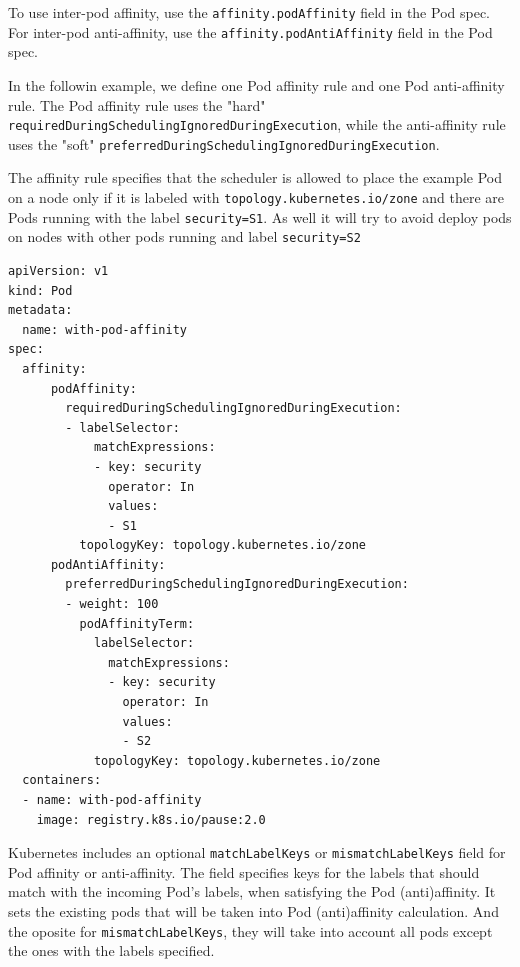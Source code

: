\documentclass{article}
\newenvironment{codetemplate}[1][]{%
  \mybasecolorbox[#1]
  \itshape
}{%
  \endmybasecolorbox
}
\begin{document}
To use inter-pod affinity, use the \verb|affinity.podAffinity| field in the Pod spec. For inter-pod anti-affinity, use the \verb|affinity.podAntiAffinity| field in the Pod spec.

In the followin example, we define one Pod affinity rule and one Pod anti-affinity rule. The Pod affinity rule uses the "hard" 
\verb|requiredDuringSchedulingIgnoredDuringExecution|, while the anti-affinity rule uses the "soft" 
\verb|preferredDuringSchedulingIgnoredDuringExecution|. 

The affinity rule specifies that the scheduler is allowed to place the example Pod on a node only if it is labeled with \verb|topology.kubernetes.io/zone| and there are Pods running with the label \verb|security=S1|. As well it will try to avoid deploy pods on nodes with other pods running and label \verb|security=S2|

\begin{codetemplate}{}
\begin{verbatim}
apiVersion: v1
kind: Pod
metadata:
  name: with-pod-affinity
spec:
  affinity:
      podAffinity:
        requiredDuringSchedulingIgnoredDuringExecution:
        - labelSelector:
            matchExpressions:
            - key: security
              operator: In
              values:
              - S1
          topologyKey: topology.kubernetes.io/zone
      podAntiAffinity:
        preferredDuringSchedulingIgnoredDuringExecution:
        - weight: 100
          podAffinityTerm:
            labelSelector:
              matchExpressions:
              - key: security
                operator: In
                values:
                - S2
            topologyKey: topology.kubernetes.io/zone
  containers:
  - name: with-pod-affinity
    image: registry.k8s.io/pause:2.0                     
\end{verbatim}
\end{codetemplate}

Kubernetes includes an optional \verb|matchLabelKeys| or \verb|mismatchLabelKeys| field for Pod affinity or anti-affinity. The field specifies keys for the labels that should match with the incoming Pod's labels, when satisfying the Pod (anti)affinity. 
It sets the existing pods that will be taken into Pod (anti)affinity calculation. And the oposite for \verb|mismatchLabelKeys|, they will take into account all pods except the ones with the labels specified.
\end{document}
